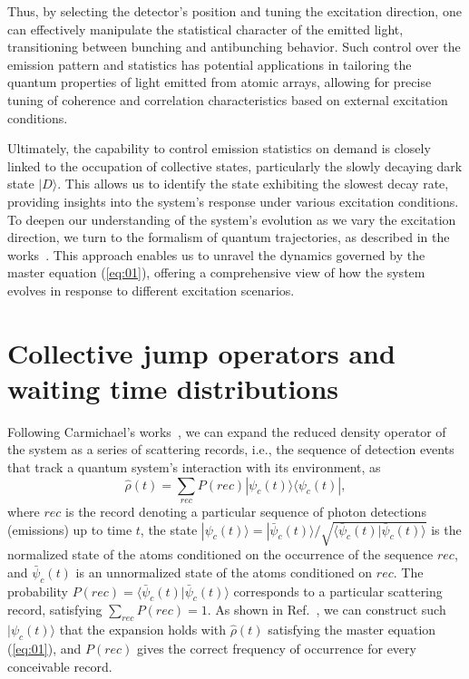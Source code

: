 \documentclass[aps,prl,twocolumn,superscriptaddress,showpacs,amsmath,amssymb]{revtex4-2}
\begin{document}
Thus, by selecting the detector's position and tuning the excitation direction, one can effectively manipulate the statistical character of the emitted light, transitioning between bunching and antibunching behavior. 
Such control over the emission pattern and statistics has potential applications in tailoring the quantum properties of light emitted from atomic arrays, allowing for precise tuning of coherence and correlation characteristics based on external excitation conditions.

Ultimately, the capability to control emission statistics on demand is closely linked to the occupation of collective states, particularly the slowly decaying dark state $ |D\rangle $. 
This allows us to identify the state exhibiting the slowest decay rate, providing insights into the system's response under various excitation conditions. 
To deepen our understanding of the system's evolution as we vary the excitation direction, we turn to the formalism of quantum trajectories, as described in the works~\cite{carmichael2000quantum,clemens2003collective,carmichael2009statistical}. 
This approach enables us to unravel the dynamics governed by the master equation (\ref{eq:01}), offering a comprehensive view of how the system evolves in response to different excitation scenarios. 


\section{Collective jump operators and waiting time distributions}

Following Carmichael's works~\cite{carmichael2009statistical,carmichael2000quantum,clemens2003collective}, we can expand the reduced density operator of the system as a series of scattering records, i.e., the sequence of detection events that track a quantum system's interaction with its environment, as
\[
\hat{\rho}(t) = \sum_{rec} P(rec) | \psi_c (t) \rangle \langle  \psi_c (t) |,
\]
where $rec$ is the record denoting a particular sequence of photon detections (emissions) up to time $ t $, the state $ | \psi_c(t) \rangle = | \bar{\psi}_c(t) \rangle / \sqrt{\langle \bar{\psi}_c(t) | \bar{\psi}_c(t) \rangle} $ is the normalized state of the atoms conditioned on the occurrence of the sequence $ rec $, and $ \bar{\psi}_c(t) $ is an unnormalized state of the atoms conditioned on $ rec $. The probability $ P(rec) = \langle \bar{\psi}_c(t) | \bar{\psi}_c(t) \rangle $ corresponds to a particular scattering record, satisfying $ \sum_{rec} P(rec) = 1 $. As shown in Ref.~\cite{carmichael2000quantum}, we can construct such $ | \psi_c(t) \rangle $ that the expansion holds with $ \hat{\rho}(t) $ satisfying the master equation (\ref{eq:01}), and $ P(rec) $ gives the correct frequency of occurrence for every conceivable record.
\end{document}
